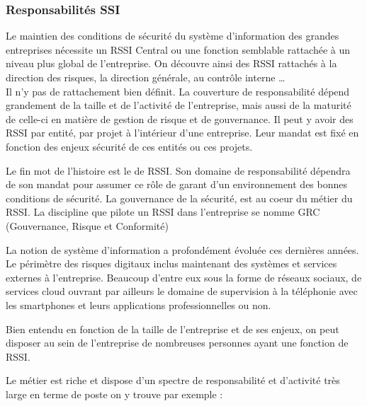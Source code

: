 \subsubsection{Responsabilités SSI}

Le maintien des conditions de sécurité du système d'information des grandes entreprises nécessite un RSSI Central ou une fonction semblable rattachée à un niveau plus global de l'entreprise.
On découvre ainsi des RSSI rattachés à la direction des risques, la direction générale, au contrôle interne …\\
 Il n'y pas de rattachement bien définit. La couverture de responsabilité dépend grandement de la taille et de l'activité de l'entreprise, mais aussi de la maturité de celle-ci en matière de gestion de risque et de gouvernance. Il peut y avoir des RSSI par entité, par projet à l’intérieur d'une entreprise. Leur mandat est fixé en fonction des enjeux sécurité de ces entités ou ces projets. 

Le fin mot de l'histoire est le  de RSSI. Son domaine de responsabilité dépendra de son mandat pour assumer ce rôle de garant d'un environnement  des bonnes conditions de sécurité.
La gouvernance de la sécurité, est au coeur du métier du RSSI. La discipline que pilote un RSSI dans l’entreprise se nomme GRC (Gouvernance, Risque et Conformité)

La notion de système d'information a profondément évoluée ces dernières années. Le périmètre des risques digitaux inclus maintenant des systèmes et services externes à l'entreprise. Beaucoup d'entre eux sous la forme de réseaux sociaux, de services cloud ouvrant par ailleurs le domaine de supervision à la téléphonie avec les smartphones et leurs applications professionnelles ou non.

Bien entendu en fonction de la taille de l'entreprise et de ses enjeux, on peut disposer au sein de l'entreprise de nombreuses personnes ayant une fonction de RSSI. 

Le métier est riche et dispose d'un spectre de responsabilité et d'activité très large en terme de poste on y trouve par exemple :

